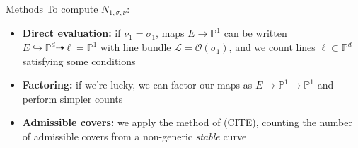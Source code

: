 \documentclass{beamer}
\renewcommand{\P}{\mathbb P}
\theoremstyle{definition}
\begin{document}
                                                                                                                                                                                                                          \begin{frame}{Methods}
                                                                                                                                                                                                                            To compute $N_{1,\sigma,\nu}$:
                                                                                                                                                                                                                            \begin{itemize}
                                                                                                                                                                                                                            \item {\bf Direct evaluation:} if $\nu_1=\sigma_1$, maps $E\to\P^1$ can be written $E\hookrightarrow\P^d\dashrightarrow \ell=\P^1$
                                                                                                                                                                                                                              with line bundle $\mathcal L=\mathcal O(\sigma_1)$,
                                                                                                                                                                                                                              and we count lines $\ell\subset\P^d$ satisfying some conditions
                                                                                                                                                                                                                            \item {\bf Factoring:} if we're lucky, we can factor our maps as $E\to\P^1\to\P^1$ and perform simpler counts
                                                                                                                                                                                                                            \item {\bf Admissible covers:} we apply the method of (CITE), counting the number of admissible covers from a non-generic
                                                                                                                                                                                                                              {\it stable} curve
                                                                                                                                                                                                                            \end{itemize}
                                                                                                                                                                                                                          \end{frame}
\end{document}

